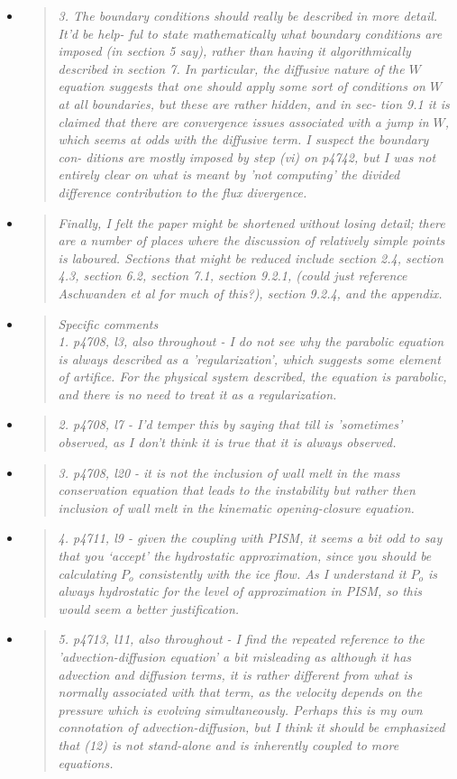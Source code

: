 \documentclass[11pt,reqno]{amsart}
\newcommand{\reply}[2]{
\medskip\medskip
\item  \begin{quote}
\emph{#1}
\end{quote}

\medskip
\noindent #2}
\begin{document}
\begin{itemize}
\reply{3. The boundary conditions should really be described in more detail.  It'd be help-
ful to state mathematically what boundary conditions are imposed (in section 5
say), rather than having it algorithmically described in section 7.  In particular,
the diffusive nature of the $W$ equation suggests that one should apply some sort
of conditions on $W$ at all boundaries, but these are rather hidden, and in sec-
tion 9.1 it is claimed that there are convergence issues associated with a jump
in $W$, which seems at odds with the diffusive term.  I suspect the boundary con-
ditions are mostly imposed by step (vi) on p4742, but I was not entirely clear on
what is meant by 'not computing' the divided difference contribution to the flux
divergence.}
{}

\reply{Finally, I felt the paper might be shortened without losing detail; there are a number
of places where the discussion of relatively simple points is laboured. Sections that
might be reduced include section 2.4, section 4.3, section 6.2, section 7.1, section
9.2.1, (could just reference Aschwanden et al for much of this?), section 9.2.4, and the
appendix.}
{}

\reply{Specific comments\\
1. p4708, l3, also throughout - I do not see why the parabolic equation is always
described as a 'regularization', which suggests some element of artifice. For the
physical system described, the equation is parabolic, and there is no need to
treat it as a regularization.}
{}

\reply{2. p4708, l7 - I’d temper this by saying that till is 'sometimes' observed, as I don’t
think it is true that it is always observed.}
{}

\reply{3. p4708, l20 - it is not the inclusion of wall melt in the mass conservation equation
that leads to the instability but rather then inclusion of wall melt in the kinematic
opening-closure equation.}
{}

\reply{4. p4711, l9 - given the coupling with PISM, it seems a bit odd to say that you
‘accept’ the hydrostatic approximation, since you should be calculating $P_o$ consistently with the ice flow. As I understand it $P_o$ is always hydrostatic for the level
of approximation in PISM, so this would seem a better justification.}
{}

\reply{5. p4713, l11, also throughout - I find the repeated reference to the 'advection-diffusion equation' a bit misleading as although it has advection and diffusion
terms, it is rather different from what is normally associated with that term, as the
velocity depends on the pressure which is evolving simultaneously.  Perhaps this
is my own connotation of advection-diffusion, but I think it should be emphasized
that (12) is not stand-alone and is inherently coupled to more equations.}
{}


\end{itemize}
\end{document}
